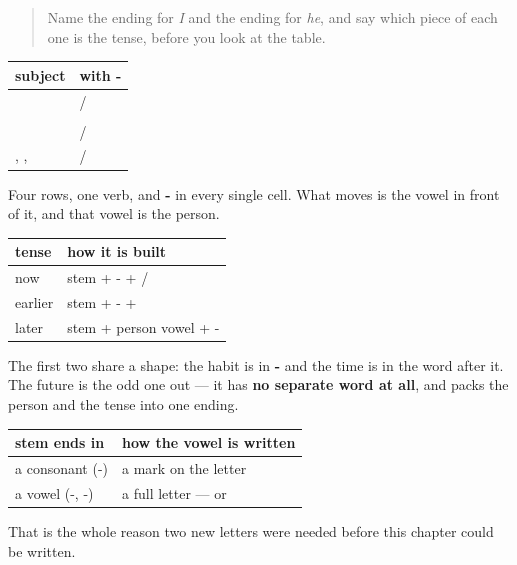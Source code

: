 \label{lesson:HI-C88-repaso-bhavishya}



\begin{quote}
Name the ending for \emph{I} and the ending for \emph{he}, and say which piece of each one is the tense, before you look at the table.
\end{quote}

\begin{grammarlens}[title={Grammar Lens: the grid}]
\noindent
\begin{tabularx}{\linewidth}{@{}>{\raggedright\arraybackslash}X>{\raggedright\arraybackslash}X@{}}
\toprule
\textbf{subject} & \textbf{with \hi{आ}-} \\
\midrule
\hi{मैं} & \hi{आऊँगा} / \hi{आऊँगी} \\
\hi{तुम} & \hi{आओगे} \\
\hi{वह} & \hi{आएगा} / \hi{आएगी} \\
\hi{हम}, \hi{वे}, \hi{आप} & \hi{आएँगे} / \hi{आएँगी} \\
\bottomrule
\end{tabularx}

Four rows, one verb, and \textbf{-} in every single cell. What moves is the vowel in front of it, and that vowel is the person.
\end{grammarlens}

\begin{grammarlens}[title={Grammar Lens: two slots, three tenses}]
\noindent
\begin{tabularx}{\linewidth}{@{}>{\raggedright\arraybackslash}X>{\raggedright\arraybackslash}X@{}}
\toprule
\textbf{tense} & \textbf{how it is built} \\
\midrule
now & stem + -\hi{ता} + \hi{हूँ} / \hi{है} \\
earlier & stem + -\hi{ता} + \hi{था} \\
later & stem + person vowel + -\hi{गा} \\
\bottomrule
\end{tabularx}

The first two share a shape: the habit is in \textbf{-} and the time is in the word after it. The future is the odd one out — it has \textbf{no separate word at all}, and packs the person and the tense into one ending.
\end{grammarlens}

\begin{grammarlens}[title={Grammar Lens: where the full letters appear}]
\noindent
\begin{tabularx}{\linewidth}{@{}>{\raggedright\arraybackslash}X>{\raggedright\arraybackslash}X@{}}
\toprule
\textbf{stem ends in} & \textbf{how the vowel is written} \\
\midrule
a consonant (\hi{कर}-) & a mark on the letter \\
a vowel (\hi{आ}-, \hi{जा}-) & a full letter — \textbf{\hi{ऊ}} or \textbf{\hi{ओ}} \\
\bottomrule
\end{tabularx}

That is the whole reason two new letters were needed before this chapter could be written.
\end{grammarlens}

